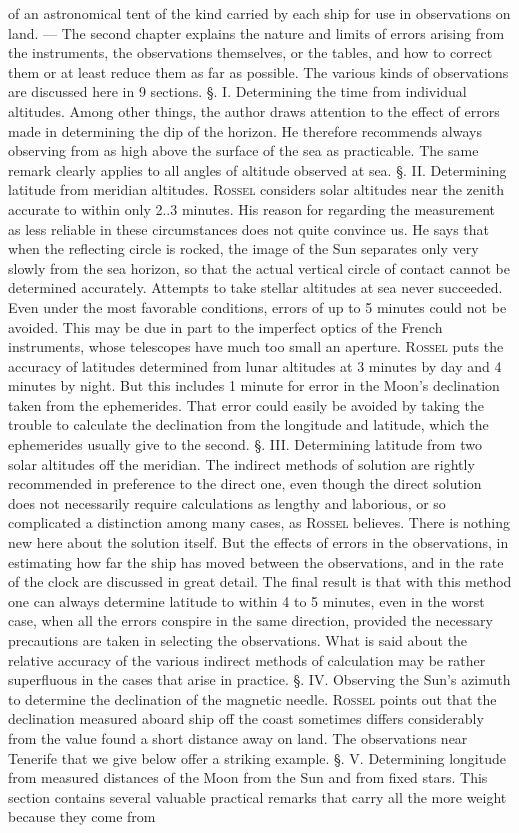 of an astronomical tent of the kind carried by each ship for use in observations on land. — The second chapter explains the nature and limits of errors arising from the instruments, the observations themselves, or the tables, and how to correct them or at least reduce them as far as possible. The various kinds of observations are discussed here in 9 sections. §. I. Determining the time from individual altitudes. Among other things, the author draws attention to the effect of errors made in determining the dip of the horizon. He therefore recommends always observing from as high above the surface of the sea as practicable. The same remark clearly applies to all angles of altitude observed at sea. §. II. Determining latitude from meridian altitudes. \textsc{Rossel} considers solar altitudes near the zenith accurate to within only 2..3 minutes. His reason for regarding the measurement as less reliable in these circumstances does not quite convince us. He says that when the reflecting circle is rocked, the image of the Sun separates only very slowly from the sea horizon, so that the actual vertical circle of contact cannot be determined accurately. Attempts to take stellar altitudes at sea never succeeded. Even under the most favorable conditions, errors of up to 5 minutes could not be avoided. This may be due in part to the imperfect optics of the French instruments, whose telescopes have much too small an aperture. \textsc{Rossel} puts the accuracy of latitudes determined from lunar altitudes at 3 minutes by day and 4 minutes by night. But this includes 1 minute for error in the Moon's declination taken from the ephemerides. That error could easily be avoided by taking the trouble to calculate the declination from the longitude and latitude, which the ephemerides usually give to the second. §. III. Determining latitude from two solar altitudes off the meridian. The indirect methods of solution are rightly recommended in preference to the direct one, even though the direct solution does not necessarily require calculations as lengthy and laborious, or so complicated a distinction among many cases, as \textsc{Rossel} believes. There is nothing new here about the solution itself. But the effects of errors in the observations, in estimating how far the ship has moved between the observations, and in the rate of the clock are discussed in great detail. The final result is that with this method one can always determine latitude to within 4 to 5 minutes, even in the worst case, when all the errors conspire in the same direction, provided the necessary precautions are taken in selecting the observations. What is said about the relative accuracy of the various indirect methods of calculation may be rather superfluous in the cases that arise in practice. §. IV. Observing the Sun's azimuth to determine the declination of the magnetic needle. \textsc{Rossel} points out that the declination measured aboard ship off the coast sometimes differs considerably from the value found a short distance away on land. The observations near Tenerife that we give below offer a striking example. §. V. Determining longitude from measured distances of the Moon from the Sun and from fixed stars. This section contains several valuable practical remarks that carry all the more weight because they come from 